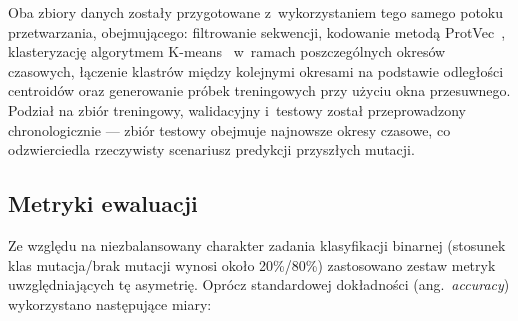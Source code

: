 Oba zbiory danych zostały przygotowane z~wykorzystaniem tego samego potoku przetwarzania, obejmującego: filtrowanie sekwencji, kodowanie metodą ProtVec~\cite{asgari2015protvec}, klasteryzację algorytmem K-means~\cite{macqueen1967kmeans} w~ramach poszczególnych okresów czasowych, łączenie klastrów między kolejnymi okresami na podstawie odległości centroidów oraz generowanie próbek treningowych przy użyciu okna przesuwnego. Podział na zbiór treningowy, walidacyjny i~testowy został przeprowadzony chronologicznie --- zbiór testowy obejmuje najnowsze okresy czasowe, co odzwierciedla rzeczywisty scenariusz predykcji przyszłych mutacji.

\subsection{Metryki ewaluacji}

Ze względu na niezbalansowany charakter zadania klasyfikacji binarnej (stosunek klas mutacja/brak mutacji wynosi około 20\%/80\%) zastosowano zestaw metryk uwzględniających tę asymetrię. Oprócz standardowej dokładności (ang.~\textit{accuracy}) wykorzystano następujące miary:

